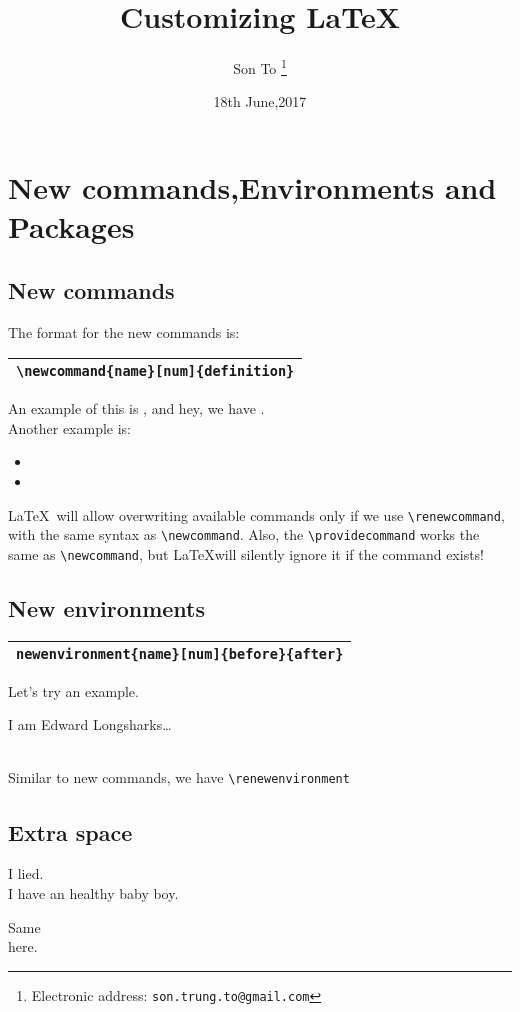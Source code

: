 \documentclass[a4paper,11pt]{article}
\begin{document}
\title{Customizing \LaTeX}
\author{Son To
  \thanks{Electronic address: \texttt{son.trung.to@gmail.com}}}
\date{18th June,2017}

  \maketitle
  \tableofcontents

\section{New commands,Environments and Packages}
\subsection{New commands}
The format for the new commands is:
\vskip 20pt
\begin{tabular}{|l|}
\hline
  \verb+\newcommand{name}[num]{definition}+ \\
\hline
\end{tabular}
\vskip 20pt
\flushleft
An example of this is \tnss, and hey, we have \tnss.\\
Another example is:
\begin{itemize}
  \item {}
  \item {}
\end{itemize}
\LaTeX~will allow overwriting available commands only if
we use \verb+\renewcommand+, with the same syntax as
\verb+\newcommand+. Also, the \verb+\providecommand+ works
the same as \verb+\newcommand+, but \LaTeX will silently
ignore it if the command exists!

\subsection{New environments}
\vskip 20pt
\begin{tabular}{|l|}
  \hline
    \verb+newenvironment{name}[num]{before}{after}+ \\
  \hline
\end{tabular}
\vskip 20pt
\flushleft
Let's try an example.\\
\begin{king}
  I am Edward Longsharks\ldots
\end{king}
\\
Similar to new commands, we have \verb+\renewenvironment+

\subsection{Extra space}
\begin{simple}
  I lied.\\ I have an healthy baby boy.
\end{simple}
Same\\here.
\end{document}
